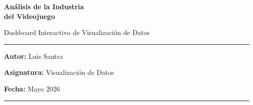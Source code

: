 \documentclass[11pt,a4paper]{article}
\begin{document}
\begin{titlepage}
\begin{center}

\vspace*{2cm}

{\Huge\bfseries\sffamily\textcolor{accent}{Análisis de la Industria\\[4pt] del Videojuego}}

\vspace{0.8cm}

{\Large\sffamily Dashboard Interactivo de Visualización de Datos}

\vspace{1.5cm}

\rule{0.6\textwidth}{0.5pt}

\vspace{1cm}

{\large\textbf{Autor:} Luis Santra}

\vspace{0.4cm}

{\large\textbf{Asignatura:} Visualización de Datos}

\vspace{0.4cm}

{\large\textbf{Fecha:} Mayo 2026}

\vspace{1.5cm}

\rule{0.6\textwidth}{0.5pt}

\vspace{1.5cm}

\begin{abstract}
\noindent
Este trabajo presenta un dashboard interactivo construido con Streamlit y Plotly que permite explorar la industria global del videojuego desde siete dimensiones complementarias: visión macroeconómica, distribución geográfica de estudios, evolución de plataformas, análisis financiero bursátil, estructura corporativa, recepción comunitaria y un salón de la fama. El proyecto integra un pipeline ETL end-to-end que recopila datos de seis fuentes heterogéneas (RAWG, IGDB, VGChartz, GameDevMap, yfinance y datos de mercado sectoriales) y los consolida en una base de datos SQLite relacional con más de 200.000 registros. La visualización emplea principios de diseño visual avanzado ---glassmorfismo, paletas semánticas, animaciones dinámicas y cuadrantes analíticos tipo Gartner--- para transformar datos complejos en narrativas visuales accesibles e interactivas. El resultado es una herramienta de análisis que cubre la cadena completa desde la ingestión de datos hasta la visualización final, demostrando cómo las decisiones de diseño visual pueden amplificar la comprensión de fenómenos industriales complejos.
\end{abstract}

\end{center}
\end{titlepage}
\end{document}
